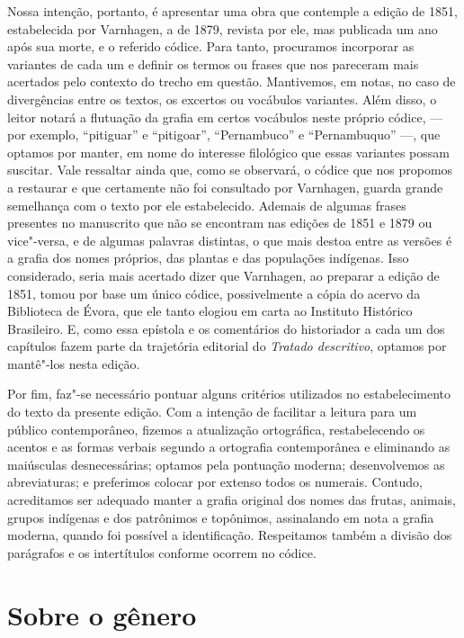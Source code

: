 Nossa intenção, portanto, é apresentar uma obra que contemple a edição
de 1851, estabelecida por Varnhagen, a de 1879, revista por ele, mas publicada um ano após sua
morte, e o referido códice. Para tanto, procuramos incorporar as
variantes de cada um e definir os termos ou frases que nos pareceram
mais acertados pelo contexto do trecho em questão. Mantivemos, em
notas, no caso de divergências entre os textos, os excertos ou
vocábulos variantes. Além disso, o leitor notará a flutuação da grafia 
em certos vocábulos neste próprio códice, --- por exemplo, ``pitiguar'' e ``pitigoar'', 
``Pernambuco'' e ``Pernambuquo'' ---, que optamos por manter, em nome do interesse 
filológico que essas variantes possam suscitar.
 Vale ressaltar ainda que, como se observará, o
códice que nos propomos a restaurar e que certamente não foi consultado
por Varnhagen, guarda grande semelhança com o texto por ele
estabelecido. Ademais de algumas frases presentes no manuscrito que não
se encontram nas edições de 1851 e 1879 ou vice"-versa, e de algumas
palavras distintas, o que mais destoa entre as versões é a grafia dos
nomes próprios, das plantas e das populações indígenas. Isso
considerado, seria mais acertado dizer que Varnhagen, ao preparar a
edição de 1851, tomou por base um único códice, possivelmente a cópia
do acervo da Biblioteca de Évora, que ele tanto elogiou em carta ao
Instituto Histórico Brasileiro. E, como essa epístola e os comentários
do historiador a cada um dos capítulos fazem parte da trajetória
editorial do \textit{Tratado descritivo}, optamos por mantê"-los nesta edição. 

Por fim, faz"-se necessário pontuar alguns critérios utilizados no
estabelecimento do texto da presente edição. Com a intenção de
facilitar a leitura para um público contemporâneo, fizemos a
atualização ortográfica, restabelecendo os acentos e as formas verbais
segundo a ortografia contemporânea e eliminando as maiúsculas
desnecessárias; optamos pela pontuação moderna; desenvolvemos as
abreviaturas; e preferimos colocar por extenso todos os numerais.
Contudo, acreditamos ser adequado manter a grafia original dos nomes
das frutas, animais, grupos indígenas e dos patrônimos e topônimos,
assinalando em nota a grafia moderna, quando foi possível a
identificação. Respeitamos também a divisão dos parágrafos e os
intertítulos conforme ocorrem no códice.  

\section{Sobre o gênero}




